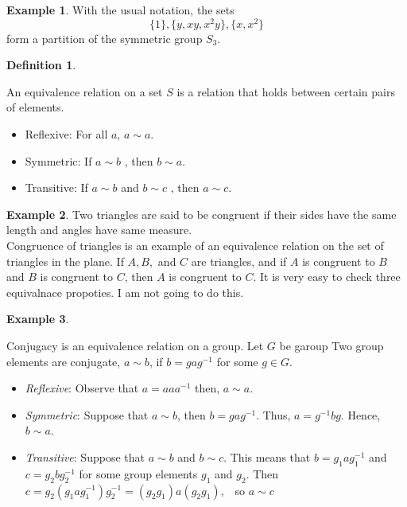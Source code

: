 \documentclass[
]{book}
\providecommand{\tightlist}{%
  \setlength{\itemsep}{0pt}\setlength{\parskip}{0pt}}
\theoremstyle{definition}
\newtheorem{definition}{Definition}[chapter]
\theoremstyle{definition}
\newtheorem{example}{Example}[chapter]
\theoremstyle{definition}
\theoremstyle{definition}
\theoremstyle{remark}
\begin{document}
\begin{example}
\protect\hypertarget{exm:unnamed-chunk-18}{}\label{exm:unnamed-chunk-18}With the usual notation, the sets
\[\{1\}, \{y, xy, x^2y\}, \{x, x^2\}\]
form a partition of the symmetric group \(S_3\).
\end{example}

\begin{definition}
\protect\hypertarget{def:unnamed-chunk-19}{}\label{def:unnamed-chunk-19}

An equivalence relation on a set \(S\) is a relation that holds between certain pairs of elements.

\begin{itemize}
\tightlist
\item
  Reflexive: For all \(a\), \(a \sim a\).
\item
  Symmetric: If \(a \sim b\) , then \(b \sim a\).
\item
  Transitive: If \(a \sim b\) and \(b \sim c\) , then \(a \sim c\).
\end{itemize}

\end{definition}

\begin{example}
\protect\hypertarget{exm:unnamed-chunk-20}{}\label{exm:unnamed-chunk-20}Two triangles are said to be congruent if their sides have the same length and angles have same measure.\\
Congruence of triangles is an example of an equivalence relation on the set of triangles in the plane. If \(A , B,\) and \(C\) are triangles, and if \(A\) is congruent to \(B\) and \(B\) is congruent to \(C\), then \(A\) is congruent to \(C\). It is very easy to check three equivalnace propoties. I am not going to do this.
\end{example}

\begin{example}
\protect\hypertarget{exm:unnamed-chunk-21}{}\label{exm:unnamed-chunk-21}

Conjugacy is an equivalence relation on a group.
Let \(G\) be garoup Two group elements are conjugate, \(a\sim b\), if \(b = gag^{- 1}\) for some \(g\in G\).

\begin{itemize}
\tightlist
\item
  \emph{Reflexive}: Observe that \(a=aaa^{-1}\) then, \(a\sim a\).
\item
  \emph{Symmetric}: Suppose that \(a\sim b\), then \(b=gag^{-1}\). Thus,
  \(a=g^{-1}bg\). Hence, \(b \sim a\).
\item
  \emph{Transitive}: Suppose that \(a\sim b\) and \(b \sim c\). This means that \(b = g_1ag_1^{-1}\) and \(c = g_2bg_2^{-1}\) for some group elements \(g_1\) and \(g_2\).
  Then \(c = g_2(g_1ag_1^{-1})g_2^{-1} = (g_2 g_1)a (g_2 g_1),\) ~so \(a \sim c\)
\end{itemize}

\end{example}
\end{document}
